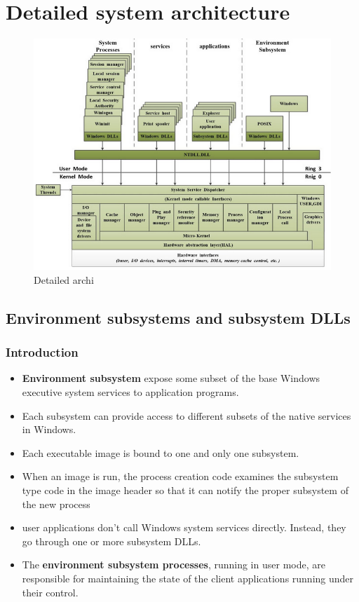 \section{Detailed system architecture}

\begin{figure}[!ht]
    \includegraphics[width=\linewidth]{knowledge/internals/images/detailed-archi.png}
    \caption{Detailed archi}
    \label{fig:windows_detailed_archi}
\end{figure}


\subsection{Environment subsystems and subsystem DLLs}

\subsubsection{Introduction}
\begin{itemize}
    \item {\bf Environment subsystem} expose some subset of the base Windows executive system services to application programs. 
    \item Each subsystem can provide access to different subsets of the native services in Windows.
    \item Each executable image is bound to one and only one subsystem.
    \item When an image is run, the process creation code examines the subsystem type code in the image header so that it can notify the proper subsystem of the new process
    \item user applications don’t call Windows system services directly. Instead, they go through one or more subsystem DLLs.
    \item The {\bf environment subsystem processes}, running in user mode, are responsible for maintaining the state of the client applications running under their control.
\end{itemize}

